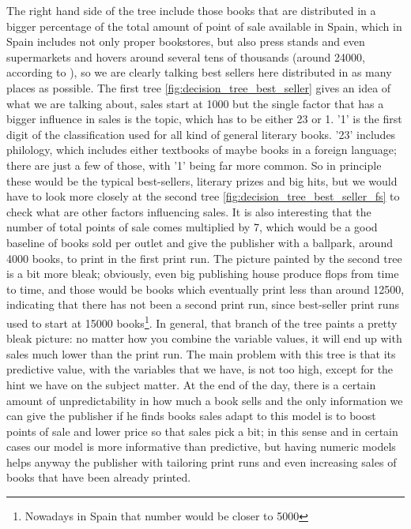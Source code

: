 \documentclass[a4paper,10pt,twocolumn,preprint,3p]{elsarticle}
\begin{document}
The right hand side of the tree include those books that are
distributed in a bigger percentage of the total amount of point of
sale available in Spain, which in Spain includes not only proper
bookstores, but also press stands and even supermarkets and hovers
around several tens of thousands (around 24000, according to
\cite{POS}), so we are clearly talking best sellers here distributed in
as many places as possible. The first tree
\ref{fig:decision_tree_best_seller} gives an idea of what we
are talking about, sales start at 1000 but the single factor that has
a bigger influence in sales is the topic, which has to be either 23 or
1. '1' is the first digit of the classification used for all kind of
general literary books. '23' includes philology, which includes either
textbooks of maybe books in a foreign language; there are just a few
of those, with '1' being far more common. So in principle these would
be the typical best-sellers, literary prizes and big hits, but we
would have to look more closely at the second tree
\ref{fig:decision_tree_best_seller_fs} to check what are other factors
influencing sales. It is also interesting that the number of total
points of sale comes multiplied by 7, which would be a good baseline
of books sold per outlet and give the publisher with a ballpark,
around 4000 books, to print in the first print run. The picture
painted by the second tree is a bit more bleak; obviously, even big
publishing house produce flops from time to time, and those would be
books which eventually print less than around 12500, indicating that
there has not been a second print run, since best-seller print runs
used to start at 15000 books\footnote{Nowadays in Spain that number
  would be closer to 5000}. In general, that branch of the tree paints
a pretty bleak picture: no matter how you combine the variable values,
it will end up with sales much lower than the print run. The main
problem with this tree is that its predictive value, with the
variables that we have, is not too high, except for the hint we have
on the subject matter. At the end of the day, there is a certain
amount of unpredictability in how much a book sells and the only
information we can give the publisher if he finds books sales adapt to
this model is to boost points of sale and lower price so that sales
pick a bit; in this sense and in certain cases our model is more
informative than predictive, but having numeric models helps anyway
the publisher with tailoring print runs and even increasing sales of
books that have been already printed.
\end{document}
